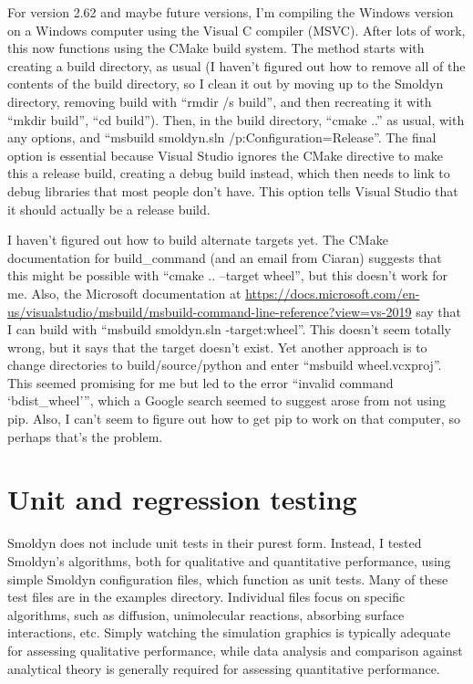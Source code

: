 \documentclass {book}
\begin{document}
For version 2.62 and maybe future versions, I'm compiling the Windows version on a Windows computer using the Visual C compiler (MSVC). After lots of work, this now functions using the CMake build system. The method starts with creating a build directory, as usual (I haven't figured out how to remove all of the contents of the build directory, so I clean it out by moving up to the Smoldyn directory, removing build with ``rmdir /s build'', and then recreating it with ``mkdir build'', ``cd build''). Then, in the build directory, ``cmake ..'' as usual, with any options, and ``msbuild smoldyn.sln /p:Configuration=Release''. The final option is essential because Visual Studio ignores the CMake directive to make this a release build, creating a debug build instead, which then needs to link to debug libraries that most people don't have. This option tells Visual Studio that it should actually be a release build.

I haven't figured out how to build alternate targets yet. The CMake documentation for build\_command (and an email from Ciaran) suggests that this might be possible with ``cmake .. --target wheel'', but this doesn't work for me. Also, the Microsoft documentation at \url{https://docs.microsoft.com/en-us/visualstudio/msbuild/msbuild-command-line-reference?view=vs-2019} say that I can build with ``msbuild smoldyn.sln -target:wheel''. This doesn't seem totally wrong, but it says that the target doesn't exist. Yet another approach is to change directories to build/source/python and enter ``msbuild wheel.vcxproj''. This seemed promising for me but led to the error ``invalid command `bdist\_wheel''', which a Google search seemed to suggest arose from not using pip. Also, I can't seem to figure out how to get pip to work on that computer, so perhaps that's the problem.


\section{Unit and regression testing}

Smoldyn does not include unit tests in their purest form. Instead, I tested Smoldyn's algorithms, both for qualitative and quantitative performance, using simple Smoldyn configuration files, which function as unit tests. Many of these test files are in the examples directory. Individual files focus on specific algorithms, such as diffusion, unimolecular reactions, absorbing surface interactions, etc. Simply watching the simulation graphics is typically adequate for assessing qualitative performance, while data analysis and comparison against analytical theory is generally required for assessing quantitative performance.
\end{document}
